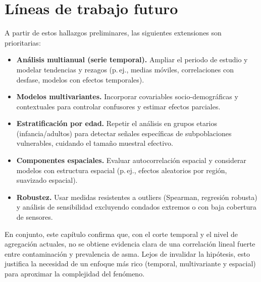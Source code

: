 \section{Líneas de trabajo futuro}
A partir de estos hallazgos preliminares, las siguientes extensiones son prioritarias:
\begin{itemize}
  \item \textbf{Análisis multianual (serie temporal).} Ampliar el periodo de estudio y modelar tendencias y rezagos
  (p.\,ej., medias móviles, correlaciones con desfase, modelos con efectos temporales).
  \item \textbf{Modelos multivariantes.} Incorporar covariables socio-demográficas y contextuales para controlar
  confusores y estimar efectos parciales.
  \item \textbf{Estratificación por edad.} Repetir el análisis en grupos etarios (infancia/adultos) para detectar
  señales específicas de subpoblaciones vulnerables, cuidando el tamaño muestral efectivo.
  \item \textbf{Componentes espaciales.} Evaluar autocorrelación espacial y considerar modelos con estructura espacial
  (p.\,ej., efectos aleatorios por región, suavizado espacial).
  \item \textbf{Robustez.} Usar medidas resistentes a outliers (Spearman, regresión robusta) y análisis de sensibilidad
  excluyendo condados extremos o con baja cobertura de sensores.
\end{itemize}

En conjunto, este capítulo confirma que, con el corte temporal y el nivel de agregación actuales, no se obtiene
evidencia clara de una correlación lineal fuerte entre contaminación y prevalencia de asma. Lejos de invalidar la
hipótesis, esto justifica la necesidad de un enfoque más rico (temporal, multivariante y espacial) para aproximar
la complejidad del fenómeno.
